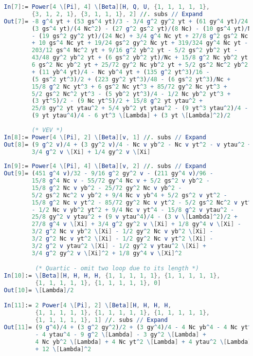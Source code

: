 \documentclass{scrartcl}
\begin{document}
\begin{lstlisting}[language=mathematica,mathescape,columns=flexible,backgroundcolor=\color{light-gray}]
In[7]:= Power[4 \[Pi], 4] \[Beta][H, Q, U, {1, 1, 1, 1, 1}, 
        {3, 1, 2, 1}, {3, 1, 1, 1}, 2] //. subs // Expand
Out[7]= -8 g^4 yt + (53 gs^4 yt)/3 - 3/4 g^2 gy^2 yt + (61 gy^4 yt)/24 - 
        (3 gs^4 yt)/(4 Nc^2) - (27 g^2 gs^2 yt)/(8 Nc) - (10 gs^4 yt)/Nc
        - (19 gs^2 gy^2 yt)/(24 Nc) + 3/4 g^4 Nc yt + 27/8 g^2 gs^2 Nc yt
        + 10 gs^4 Nc yt + 19/24 gs^2 gy^2 Nc yt + 319/324 gy^4 Nc yt - 
        203/12 gs^4 Nc^2 yt + 9/16 g^2 yb^2 yt - 5/2 gs^2 yb^2 yt - 
        43/48 gy^2 yb^2 yt + (6 gs^2 yb^2 yt)/Nc + 15/8 g^2 Nc yb^2 yt -
        6 gs^2 Nc yb^2 yt + 25/72 gy^2 Nc yb^2 yt + 5/2 gs^2 Nc^2 yb^2 yt
        + (11 yb^4 yt)/4 - Nc yb^4 yt + (135 g^2 yt^3)/16 - 
        (5 gs^2 yt^3)/2 + (223 gy^2 yt^3)/48 - (6 gs^2 yt^3)/Nc + 
        15/8 g^2 Nc yt^3 + 6 gs^2 Nc yt^3 + 85/72 gy^2 Nc yt^3 + 
        5/2 gs^2 Nc^2 yt^3 - (5 yb^2 yt^3)/4 - 1/2 Nc yb^2 yt^3 + 
        (3 yt^5)/2 - (9 Nc yt^5)/2 + 15/8 g^2 yt ytau^2 + 
        25/8 gy^2 yt ytau^2 + 5/4 yb^2 yt ytau^2 - (9 yt^3 ytau^2)/4 - 
        (9 yt ytau^4)/4 - 6 yt^3 \[Lambda] + (3 yt \[Lambda]^2)/2
        
        (* VEV *)
In[8]:= Power[4 \[Pi], 2] \[Beta][v, 1] //. subs // Expand
Out[8]= (9 g^2 v)/4 + (3 gy^2 v)/4 - Nc v yb^2 - Nc v yt^2 - v ytau^2 + 
        3/4 g^2 v \[Xi] + 1/4 gy^2 v \[Xi]
        
In[9]:= Power[4 \[Pi], 4] \[Beta][v, 2] //. subs // Expand
Out[9]= (451 g^4 v)/32 - 9/16 g^2 gy^2 v - (211 gy^4 v)/96 - 
        15/8 g^4 Nc v - 55/72 gy^4 Nc v + 5/2 gs^2 v yb^2 - 
        15/8 g^2 Nc v yb^2 - 25/72 gy^2 Nc v yb^2 - 
        5/2 gs^2 Nc^2 v yb^2 + 9/4 Nc v yb^4 + 5/2 gs^2 v yt^2 - 
        15/8 g^2 Nc v yt^2 - 85/72 gy^2 Nc v yt^2 - 5/2 gs^2 Nc^2 v yt^2 
        - 1/2 Nc v yb^2 yt^2 + 9/4 Nc v yt^4 - 15/8 g^2 v ytau^2 - 
        25/8 gy^2 v ytau^2 + (9 v ytau^4)/4 - (3 v \[Lambda]^2)/2 + 
        27/8 g^4 v \[Xi] + 3/4 g^2 gy^2 v \[Xi] + 1/8 gy^4 v \[Xi] - 
        3/2 g^2 Nc v yb^2 \[Xi] - 1/2 gy^2 Nc v yb^2 \[Xi] - 
        3/2 g^2 Nc v yt^2 \[Xi] - 1/2 gy^2 Nc v yt^2 \[Xi] - 
        3/2 g^2 v ytau^2 \[Xi] - 1/2 gy^2 v ytau^2 \[Xi] + 
        3/4 g^2 gy^2 v \[Xi]^2 + 1/8 gy^4 v \[Xi]^2

         (* Quartic - omit two loop due to its length *)
In[10]:= \[Beta][H, H, H, H, {1, 1, 1, 1, 1}, {1, 1, 1, 1, 1}, 
         {1, 1, 1, 1, 1}, {1, 1, 1, 1, 1}, 0]
Out[10]= \[Lambda]/2

In[11]:= 2 Power[4 \[Pi], 2] \[Beta][H, H, H, H, 
         {1, 1, 1, 1, 1}, {1, 1, 1, 1, 1}, {1, 1, 1, 1, 1}, 
         {1, 1, 1, 1, 1}, 1] //. subs // Expand
Out[11]= (9 g^4)/4 + (3 g^2 gy^2)/2 + (3 gy^4)/4 - 4 Nc yb^4 - 4 Nc yt^4 
         - 4 ytau^4 - 9 g^2 \[Lambda] - 3 gy^2 \[Lambda] + 
         4 Nc yb^2 \[Lambda] + 4 Nc yt^2 \[Lambda] + 4 ytau^2 \[Lambda] 
         + 12 \[Lambda]^2
         
\end{lstlisting}
\newpage
\printbibliography
\end{document}
